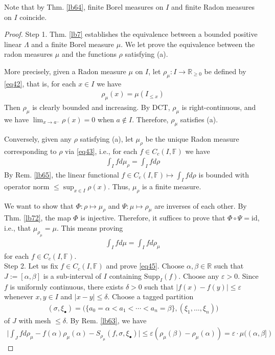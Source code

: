 \documentclass[12pt,b5paper,notitlepage]{article}
\theoremstyle{definition}
\theoremstyle{plain}
\newcommand{\id}{\mathrm{id}}
\newcommand{\blt}{\bullet}
\newcommand{\Rbb}{\mathbb R}
\newcommand{\Supp}{\mathrm{Supp}}
\newcommand{\Fbb}{\mathbb F}
\newcommand{\eps}{\varepsilon}
\numberwithin{equation}{section}
\begin{document}
Note that by Thm. \ref{lb64}, finite Borel measures on $I$ and finite Radon measures on $I$ coincide.


\begin{proof}
Step 1. Thm. \ref{lb7} establishes the equivalence between a bounded positive linear $\Lambda$ and a finite Borel measure $\mu$. We let prove the equivalence between the radon measures $\mu$ and the functions $\rho$ satisfying (a).

More precisely, given a Radon measure $\mu$ on $I$, let $\rho_\mu:I\rightarrow\Rbb_{\geq0}$ be defined by \eqref{eq42}, that is, for each $x\in I$ we have 
\begin{align}
\rho_\mu(x)=\mu(I_{\leq x})
\end{align}
Then $\rho_\mu$ is clearly bounded and increasing. By DCT,  $\rho_\mu$ is right-continuous, and we have $\lim_{x\rightarrow a^-}\rho(x)=0$ when $a\notin I$. Therefore, $\rho_\mu$ satisfies (a). 

Conversely, given any $\rho$ satisfying (a), let $\mu_\rho$ be the unique Radon measure corresponding to $\rho$ via \eqref{eq43}, i.e., for each $f\in C_c(I,\Fbb)$ we have
\begin{align}\label{eq46}
\int_I f d\mu_\rho=\int_I fd\rho
\end{align}
By Rem. \ref{lb65}, the linear functional $f\in C_c(I,\Fbb)\mapsto \int_Ifd\rho$ is bounded with operator norm $\leq\sup_{x\in I}\rho(x)$. Thus, $\mu_\rho$ is a finite measure.

We want to show that $\Phi:\rho\mapsto\mu_\rho$ and $\Psi:\mu\mapsto\rho_\mu$ are inverses of each other. By Thm. \ref{lb72}, the map $\Phi$ is injective. Therefore, it suffices to prove that $\Phi\circ\Psi=\id$, i.e., that $\mu_{\rho_\mu}=\mu$. This means proving
\begin{align}\label{eq45}
\int_I fd\mu=\int_Ifd\rho_\mu
\end{align}
for each $f\in C_c(I,\Fbb)$. \\[-1ex]

Step 2.  Let us fix $f\in C_c(I,\Fbb)$ and prove \eqref{eq45}. Choose $\alpha,\beta\in\Rbb$ such that $J:=[\alpha,\beta]$ is a sub-interval of $I$ containing $\Supp_I(f)$. Choose any $\eps>0$. Since $f$ is uniformly continuous, there exists $\delta>0$ such that $|f(x)-f(y)|\leq\eps$ whenever $x,y\in I$ and $|x-y|\leq\delta$. Choose a tagged partition
\begin{align*}
(\sigma,\xi_\blt)=\big(\{a_0=\alpha<a_1<\cdots<a_n=\beta\},(\xi_1,\dots,\xi_n) \big)
\end{align*}
of $J$ with mesh $\leq\delta$. By Rem. \ref{lb63}, we have
\begin{align}\label{eq44}
\Big| \int_Jfd\rho_\mu-f(\alpha)\rho_\mu(\alpha)-S_{\rho_\mu}(f,\sigma,\xi_\blt)\Big|\leq \eps(\rho_\mu(\beta)-\rho_\mu(\alpha))=\eps\cdot\mu((\alpha,\beta])
\end{align}



\end{proof}
\end{document}

